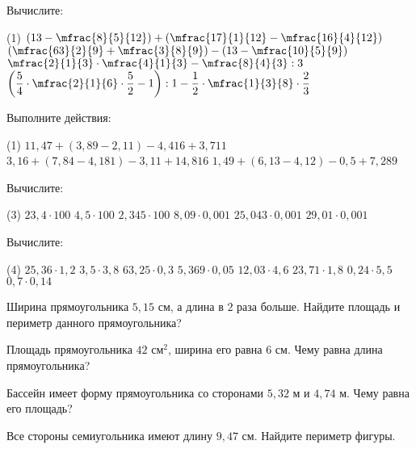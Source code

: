 \begin{class}[number=8]
	\begin{listofex}
		\item Вычислите: 
		\begin{tasks}(1)
			\task \( \left( 13-\mfrac{8}{5}{12} \right)+\left( \mfrac{17}{1}{12}-\mfrac{16}{4}{12} \right) \)
			\task \( \left( \mfrac{63}{2}{9}+\mfrac{3}{8}{9} \right)-\left( 13-\mfrac{10}{5}{9} \right) \)
			\task \( \mfrac{2}{1}{3}\cdot\mfrac{4}{1}{3}-\mfrac{8}{4}{3}:3 \)
			\task \( \left( \dfrac{5}{4}\cdot\mfrac{2}{1}{6}\cdot\dfrac{5}{2}-1 \right):1-\dfrac{1}{2}\cdot\mfrac{1}{3}{8}\cdot\dfrac{2}{3} \)
		\end{tasks}
		\item Выполните действия:
		\begin{tasks}(1)
			\task \( 11,47+(3,89-2,11)-4,416+3,711 \)
			\task \( 3,16+(7,84-4,181)-3,11+14,816 \)
			\task \( 1,49+(6,13-4,12)-0,5+7,289 \)
		\end{tasks}
		\item Вычислите:
		\begin{tasks}(3)
			\task \( 23,4\cdot100 \)
			\task\( 4,5 \cdot100 \)
			\task \( 2,345\cdot100 \)
			\task\( 8,09\cdot0,001 \) 
			\task\( 25,043 \cdot0,001  \)
			\task\( 29,01\cdot0,001   \)
		\end{tasks}
		\item Вычислите:
		\begin{tasks}(4)
			\task \( 25,36\cdot1,2 \)
			\task \( 3,5\cdot3,8 \)
			\task \( 63,25\cdot0,3 \)
			\task \( 5,369\cdot0,05 \)
			\task \( 12,03\cdot4,6 \)
			\task \( 23,71\cdot1,8 \)
			\task \( 0,24\cdot5,5 \)
			\task \( 0,7\cdot0,14 \)
		\end{tasks}
		\item Ширина прямоугольника \( 5,15 \) см, а длина в \( 2 \) раза больше. Найдите площадь и периметр данного прямоугольника?
		\item Площадь прямоугольника \( 42 \) см\( ^{2} \), ширина его равна \( 6 \) см. Чему равна длина прямоугольника?
		\item Бассейн имеет форму прямоугольника со сторонами \( 5,32 \) м и \( 4,74 \) м. Чему равна его площадь?
		\item Все стороны семиугольника имеют длину \( 9,47 \) см. Найдите периметр фигуры.
	\end{listofex}
\end{class}
